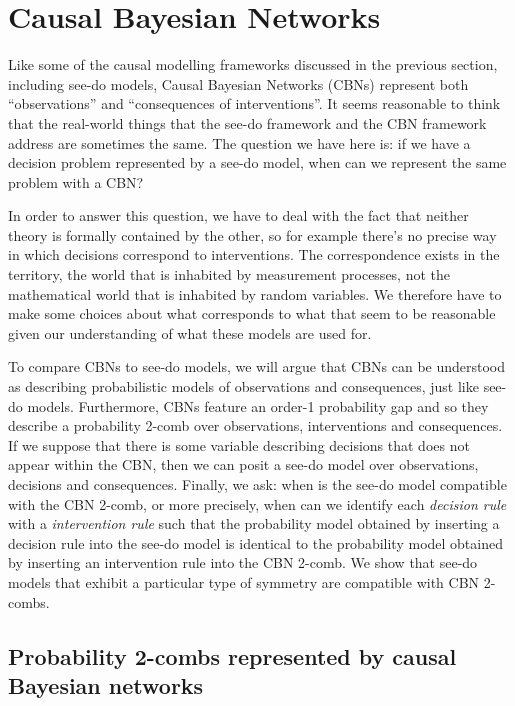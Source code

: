 

\section{Causal Bayesian Networks}\label{sec:CBN}

Like some of the causal modelling frameworks discussed in the previous section, including see-do models, Causal Bayesian Networks (CBNs) represent both ``observations'' and ``consequences of interventions''. It seems reasonable to think that the real-world things that the see-do framework and the CBN framework address are sometimes the same. The question we have here is: if we have a decision problem represented by a see-do model, when can we represent the same problem with a CBN?

In order to answer this question, we have to deal with the fact that neither theory is formally contained by the other, so for example there's no precise way in which decisions correspond to interventions. The correspondence exists in the territory, the world that is inhabited by measurement processes, not the mathematical world that is inhabited by random variables. We therefore have to make some choices about what corresponds to what that seem to be reasonable given our understanding of what these models are used for.

To compare CBNs to see-do models, we will argue that CBNs can be understood as describing probabilistic models of observations and consequences, just like see-do models. Furthermore, CBNs feature an order-1 probability gap and so they describe a probability 2-comb over observations, interventions and consequences. If we suppose that there is some variable describing decisions that does not appear within the CBN, then we can posit a see-do model over observations, decisions and consequences. Finally, we ask: when is the see-do model compatible with the CBN 2-comb, or more precisely, when can we identify each \emph{decision rule} with a \emph{intervention rule} such that the probability model obtained by inserting a decision rule into the see-do model is identical to the probability model obtained by inserting an intervention rule into the CBN 2-comb. We show that see-do models that exhibit a particular type of symmetry are compatible with CBN 2-combs.

\subsection{Probability 2-combs represented by causal Bayesian networks}

